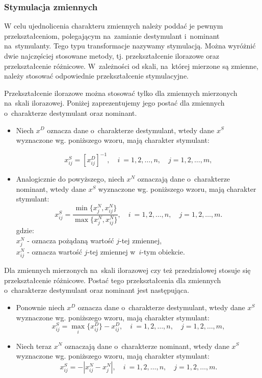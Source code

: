 \documentclass[12pt,a4paper]{report}
\begin{document}
\subsubsection{Stymulacja zmiennych}
W celu ujednolicenia charakteru zmiennych należy poddać je pewnym przekształceniom, polegającym na~zamianie destymulant i~nominant na~stymulanty. Tego typu transformacje nazywamy stymulacją. Można wyróżnić dwie najczęściej stosowane metody, tj. przekształcenie ilorazowe oraz przekształcenie różnicowe. W~zależności od skali, na~której mierzone są zmienne, należy stosować odpowiednie przekształcenie stymulacyjne.

Przekształcenie ilorazowe można stosować tylko dla zmiennych mierzonych na~skali ilorazowej. Poniżej zaprezentujemy jego postać dla zmiennych o~charakterze destymulant oraz nominant.
\begin{itemize}
\item Niech $x^{D}$ oznacza dane o~charakterze destymulant, wtedy dane $x^{S}$ wyznaczone wg. poniższego wzoru, mają charakter stymulant:

$$
x_{ij}^{S}=[x_{ij}^{D}]^{-1},  \quad i~= 1,2, \ldots, n, \quad j=1,2,\ldots, m,
$$

\item Analogicznie do powyższego, niech $x^{N}$ oznaczają dane o~charakterze nominant, wtedy dane $x^{S}$ wyznaczone wg. poniższego wzoru, mają charakter stymulant:
$$
x_{ij}^{S}=\frac{\min\{x_{j}^{N},x_{ij}^{N}\}}{\max\{x_{j}^{N},x_{ij}^{N}\}}, \quad i~= 1,2, \ldots, n, \quad j=1,2,\ldots, m.
$$
gdzie:\\
$x_{j}^{N}$ - oznacza pożądaną wartość $j$-tej zmiennej,\\
$x_{ij}^{N}$ - oznacza wartość $j$-tej zmiennej w~$i$-tym obiekcie.
\end{itemize}

Dla zmiennych mierzonych na~skali ilorazowej czy też przedziałowej stosuje się przekształcenie różnicowe. Postać tego przekształcenia dla zmiennych o~charakterze destymulant oraz nominant jest następująca.
\begin{itemize}

\item Ponownie niech $x^{D}$ oznacza dane o~charakterze destymulant, wtedy dane $x^{S}$ wyznaczone wg. poniższego wzoru, mają charakter stymulant:
$$
x_{ij}^{S}=\max\limits_{i} \{x_{ij}^{D}\} - x_{ij}^{D}, \quad i~= 1,2, \ldots, n, \quad j=1,2,\ldots, m,
$$
\item Niech teraz $x^{N}$ oznaczają dane o~charakterze nominant, wtedy dane $x^{S}$ wyznaczone wg. poniższego wzoru, mają charakter stymulant:
$$
x_{ij}^{S}=-|x_{ij}^{N}-x_{j}^{N}|, \quad i~= 1,2, \ldots, n, \quad j=1,2,\ldots, m.
$$
\end{itemize}
\end{document}
